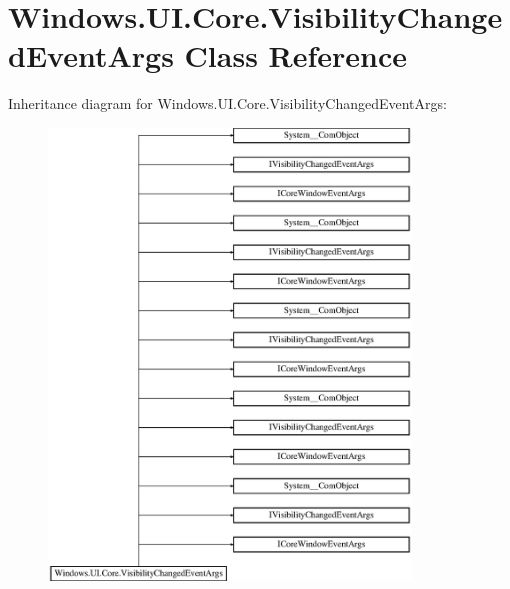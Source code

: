\hypertarget{class_windows_1_1_u_i_1_1_core_1_1_visibility_changed_event_args}{}\section{Windows.\+U\+I.\+Core.\+Visibility\+Changed\+Event\+Args Class Reference}
\label{class_windows_1_1_u_i_1_1_core_1_1_visibility_changed_event_args}
Inheritance diagram for Windows.\+U\+I.\+Core.\+Visibility\+Changed\+Event\+Args\+:\begin{figure}[H]
\begin{center}
\leavevmode
\includegraphics[height=12.000000cm]{class_windows_1_1_u_i_1_1_core_1_1_visibility_changed_event_args}
\end{center}
\end{figure}
